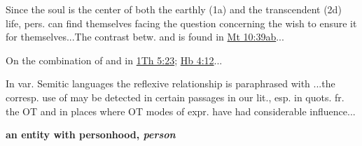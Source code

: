 \begin{compactdesc}
\begin{compactitem}
							\item[2.e] Since the soul is the center of both the earthly (1a) and the transcendent (2d) life, pers. can find themselves facing the question concerning the wish to ensure it for themselves...The contrast betw.  and  is found in \hyperref[MATTHEW-10-39]{Mt 10:39ab}...
							\item[2.f] On the combination of  and  in \hyperref[1THESSALONIANS-5-23]{1Th 5:23}; \hyperref[HEBREWS-4-12]{Hb 4:12}...
							\item[2.g] In var. Semitic languages the reflexive relationship is paraphrased with ...the corresp. use of  may be detected in certain passages in our lit., esp. in quots. fr. the OT and in places where OT modes of expr. have had considerable influence...
							\item[3] \textbf{an entity with personhood, \textit{person}}
						\end{compactitem}
						
						
						
						
						
					\item[TDNTA PDF 1221--1230] \textbf{}
						\begin{compactitem}
							\item 
						\end{compactitem}
						
						
						
				\end{compactdesc}
